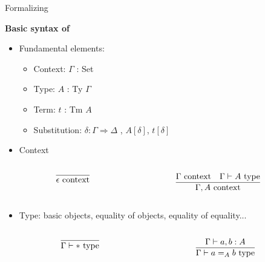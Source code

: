 \documentclass[12pt, mathserif,handout]{beamer}
\begin{document}
\begin{frame}[c]{Formalizing \wog}

\textbf{Basic syntax of \tig}

\begin{itemize}

\item Fundamental elements: 
\begin{itemize}
\item  Context: $\Gamma$ : Set
\item  Type: $A$ : Ty $\Gamma$
\item  Term: $t$ : Tm $A$
\item Substitution: $\delta : \Gamma \Rightarrow \Delta$ , $A [\delta]$, $t [\delta]$
\end{itemize}

\item Context
\begin{columns}[onlytextwidth]
 
    \begin{column}{0.4\textwidth}


\begin{equation*}
\infer{\epsilon ~ \text{context}}
{} 
\end{equation*}

    \end{column}
   \begin{column}{0.4\textwidth}

\begin{equation*}
\infer{\Gamma,A ~\text{context}}
{\Gamma ~ \text{context} & \Gamma \vdash A ~\text{type}}
\end{equation*}

    \end{column}
​  \end{columns}

\item Type: basic objects, equality of objects, equality of equality...
\begin{columns}[onlytextwidth]
 
    \begin{column}{0.4\textwidth}


\begin{equation*}
\infer{\Gamma \vdash * ~ \text{type}}
{} 
\end{equation*}

    \end{column}
   \begin{column}{0.4\textwidth}

\begin{equation*}
\infer{\Gamma \vdash a =_{A} b ~\text{type}}
{\Gamma \vdash a, b : A}
\end{equation*}

    \end{column}
​  \end{columns}



\end{itemize}

\end{frame}
\end{document}
